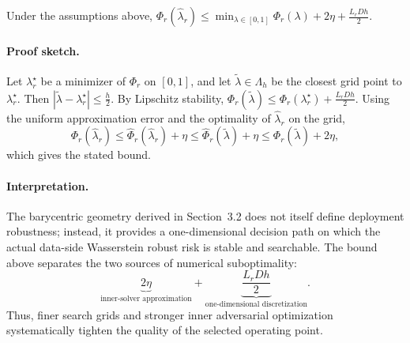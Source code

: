 \begin{proposition}
Under the assumptions above,
$
\Phi_r(\widehat\lambda_r)
\le
\min_{\lambda\in[0,1]}
\Phi_r(\lambda)
+
2\eta
+
\frac{L_rDh}{2}.
$
\end{proposition}

\paragraph{Proof sketch.}
Let $\lambda_r^\star$ be a minimizer of $\Phi_r$ on $[0,1]$, and let
$\widetilde\lambda\in\Lambda_h$ be the closest grid point to
$\lambda_r^\star$. Then
$
|\widetilde\lambda-\lambda_r^\star|
\le
\frac h2.
$
By Lipschitz stability,
$
\Phi_r(\widetilde\lambda)
\le
\Phi_r(\lambda_r^\star)
+
\frac{L_rDh}{2}.
$
Using the uniform approximation error and the optimality of
$\widehat\lambda_r$ on the grid,
\[
\Phi_r(\widehat\lambda_r)
\le
\widehat\Phi_r(\widehat\lambda_r)+\eta
\le
\widehat\Phi_r(\widetilde\lambda)+\eta
\le
\Phi_r(\widetilde\lambda)+2\eta,
\]
which gives the stated bound.

\paragraph{Interpretation.}
The barycentric geometry derived in Section~3.2 does not itself define
deployment robustness; instead, it provides a one-dimensional decision
path on which the actual data-side Wasserstein robust risk is stable and
searchable. The bound above separates the two sources of numerical
suboptimality:
\[
\underbrace{2\eta}_{\text{inner-solver approximation}}
+
\underbrace{\frac{L_rDh}{2}}_{\text{one-dimensional discretization}}.
\]
Thus, finer search grids and stronger inner adversarial optimization
systematically tighten the quality of the selected operating point.



